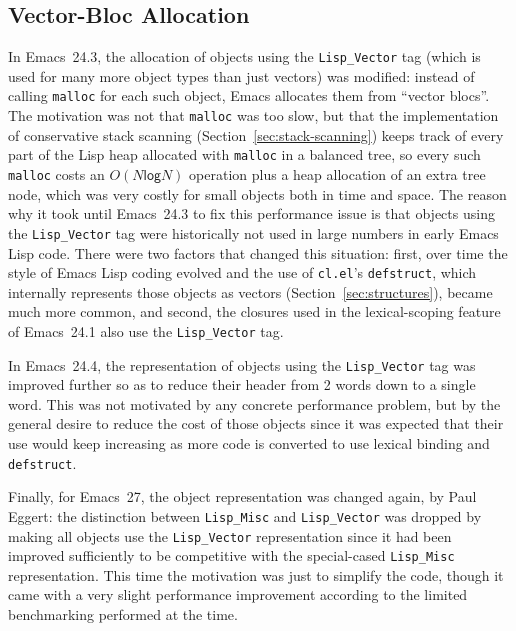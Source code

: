 \documentclass[format=acmsmall,screen]{acmart}
\newcommand \Elisp {Emacs Lisp}
\begin{document}

\subsection{Vector-Bloc Allocation}
\label{sec:vectors}

In Emacs~24.3, the allocation of objects using the \texttt{Lisp\_Vector} tag
(which is used for many more object types than just vectors) was modified:
instead of calling \texttt{malloc} for each such object, Emacs
allocates them from ``vector blocs''.  The motivation was not that
\texttt{malloc} was too slow, but that the implementation of conservative
stack scanning (Section~\ref{sec:stack-scanning}) keeps track of every part
of the Lisp
heap allocated with \texttt{malloc} in a balanced tree, so every such
\texttt{malloc} costs an $O(N \textsf{log} N)$ operation plus a heap
allocation of an extra tree node, which was very costly for small objects
both in time and space.  The reason why it took until Emacs~24.3 to fix this
performance issue is that objects using the \texttt{Lisp\_Vector} tag were
historically not used in large numbers in early \Elisp{} code.  There were
two factors that changed this situation: first, over time the style of
\Elisp{} coding evolved and the use of \texttt{cl.el}'s \texttt{defstruct},
which internally represents those objects as vectors
(Section~\ref{sec:structures}),
became much more common, and second, the
closures used in the lexical-scoping feature of Emacs~24.1 also use the
\texttt{Lisp\_Vector} tag.

In Emacs~24.4, the representation of objects using the \texttt{Lisp\_Vector}
tag was improved further so as to reduce their header from 2 words down to
a single word.  This was not motivated by any concrete performance problem,
but by the general desire to reduce the cost of those objects since it was
expected that their use would keep increasing as more code is converted to
use lexical binding and \texttt{defstruct}.

Finally, for Emacs~27, the object representation was changed again, by Paul
Eggert: the distinction between \texttt{Lisp\_Misc} and
\texttt{Lisp\_Vector} was dropped by making all objects use the
\texttt{Lisp\_Vector} representation since it had been improved sufficiently
to be competitive with the special-cased \texttt{Lisp\_Misc} representation.
This time the motivation was just to simplify the code, though it came with
a very slight performance improvement according to the limited benchmarking
performed at the time.
\end{document}

